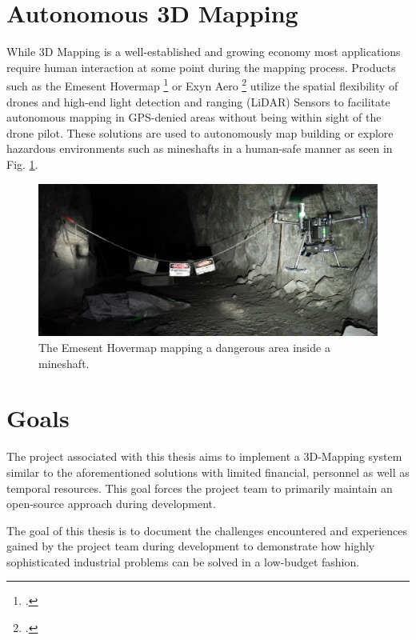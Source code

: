 \section{Autonomous 3D Mapping}
While 3D Mapping is a well-established and growing economy most applications require human interaction at some point during the mapping process. Products such as the Emesent Hovermap \footcite{hovermap2021} or Exyn Aero \footcite{exynAero2021} utilize the spatial flexibility of drones and high-end light detection and ranging (LiDAR) Sensors to facilitate autonomous mapping in GPS-denied areas without being within sight of the drone pilot. These solutions are used to autonomously map building or explore hazardous environments such as mineshafts in a human-safe manner as seen in Fig. \ref{fig:hovermap}.

\begin{figure}
	\centering
	\includegraphics[width=0.9\linewidth]{img/hovermap}
	\caption{
		The Emesent Hovermap mapping a dangerous area inside a mineshaft.\protect\footnotemark
	}
	\label{fig:hovermap}
\end{figure}

\section{Goals}
The project associated with this thesis aims to implement a 3D-Mapping system similar to the aforementioned solutions with limited financial, personnel as well as temporal resources. This goal forces the project team to primarily maintain an open-source approach during development.

The goal of this thesis is to document the challenges encountered and experiences gained by the project team during development to demonstrate how highly sophisticated industrial problems can be solved in a low-budget fashion. 



